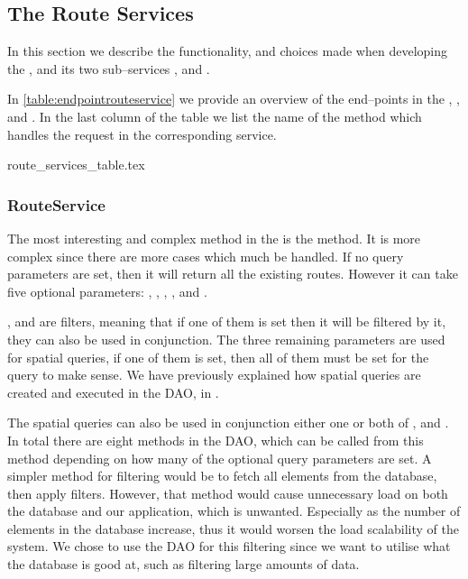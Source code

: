 \subsection{The Route Services}
In this section we describe the functionality, and choices made when developing the , 
and its two sub--services , and .

In \cref{table:endpointrouteservice} we provide an overview of the end--points in the , , and . 
In the last column of the table we list the name of the method which handles the request in the corresponding service. 

{route_services_table.tex}

\subsubsection*{RouteService}
The most interesting and complex method in the  is the  method.
It is more complex since there are more cases which much be handled. 
If no query parameters are set, then it will return all the existing routes.
However it can take five optional parameters: , , , , and .

, and  are filters, meaning that if one of them is set then it will be filtered by it, 
they can also be used in conjunction.
The three remaining parameters are used for spatial queries, if one of them is set, then all of them must be set for the query to make sense.
We have previously explained how spatial queries are created and executed in the \ac{DAO}, in .

The spatial queries can also be used in conjunction either one or both of , and . 
In total there are eight methods in the \ac{DAO}, which can be called from this method depending on how many of the optional query parameters are set.
A simpler method for filtering would be to fetch all elements from the database, then apply filters. 
However, that method would cause unnecessary load on both the database and our application, which is unwanted. 
Especially as the number of elements in the database increase, thus it would worsen the load scalability of the system. 
We chose to use the \ac{DAO} for this filtering since we want to utilise what the database is good at, such as filtering large amounts of data.

